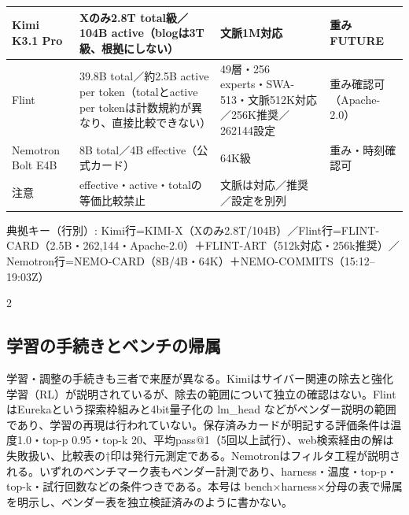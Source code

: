 \documentclass[lualatex,a4paper,10pt]{jlreq}
\begin{document}
{\centering\footnotesize
{}
\begin{tabularx}{0.96\linewidth}{@{}lXXX@{}}
\toprule
Kimi K3.1 Pro & Xのみ2.8T total級／104B active（blogは3T級、根拠にしない） & 文脈1M対応 & 重みFUTURE \\
\midrule
Flint & 39.8B total／約2.5B active per token（totalとactive per tokenは計数規約が異なり、直接比較できない） & 49層・256 experts・SWA-513・文脈512K対応／256K推奨／262144設定 & 重み確認可（Apache-2.0） \\
Nemotron Bolt E4B & 8B total／4B effective（公式カード） & 64K級 & 重み・時刻確認可 \\
注意 & effective・active・totalの等価比較禁止 & 文脈は対応／推奨／設定を別列 &  \\
\bottomrule
\end{tabularx}
{\scriptsize\color{SurveyMuted} 典拠キー（行別）: Kimi行=KIMI-X（Xのみ2.8T/104B）／Flint行=FLINT-CARD（2.5B・262,144・Apache-2.0）＋FLINT-ART（512k対応・256k推奨）／Nemotron行=NEMO-CARD（8B/4B・64K）＋NEMO-COMMITS（15:12–19:03Z）\par}
} %
\begin{multicols}{2} %


\subsection*{学習の手続きとベンチの帰属}


学習・調整の手続きも三者で来歴が異なる。Kimiはサイバー関連の除去と強化学習（RL）が説明されているが、除去の範囲について独立の確認はない。FlintはEurekaという探索枠組みと4bit量子化の lm\_head などがベンダー説明の範囲であり、学習の再現は行われていない。保存済みカードが明記する評価条件は温度1.0・top-p 0.95・top-k 20、平均pass@1（5回以上試行）、web検索経由の解は失敗扱い、比較表の†印は発行元測定である。Nemotronはフィルタ工程が説明される。いずれのベンチマーク表もベンダー計測であり、harness・温度・top-p・top-k・試行回数などの条件つきである。本号は bench×harness×分母の表で帰属を明示し、ベンダー表を独立検証済みのように書かない。


\end{multicols} %
\end{document}
